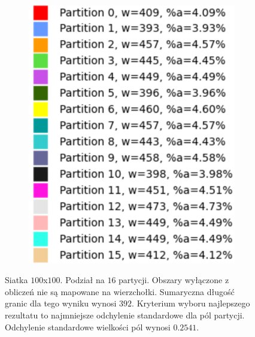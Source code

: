 \begin{figure}[h]
\begin{subfigure}{.33\textwidth}
    \caption[short]{}
\end{subfigure}%
\begin{subfigure}{.33\textwidth}
    \centering
    \includegraphics[width=0.9\linewidth]{images/results/m_k/with/15/results}
    \caption[short]{}
\end{subfigure}
\caption{Siatka $100$x$100$. Podział na $16$ partycji.
Obszary wyłączone z obliczeń nie są mapowane na wierzchołki.
Sumaryczna długość granic dla tego wyniku wynosi $392$.
Kryterium wyboru najlepszego rezultatu to najmniejsze odchylenie standardowe dla pól partycji.
Odchylenie standardowe wielkości pól wynosi $0.2541$.}
\label{result:15}
\end{figure}
